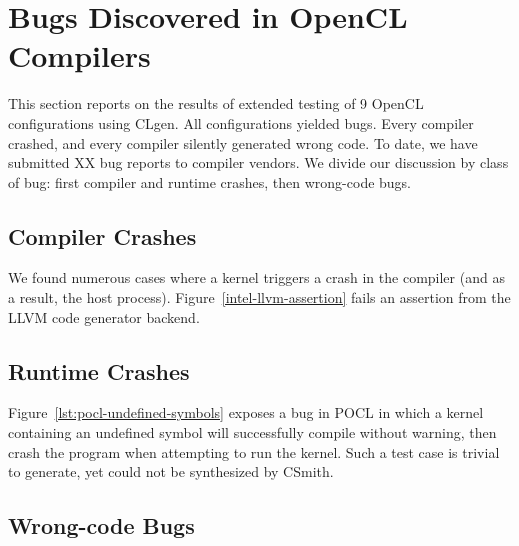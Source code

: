 \section{Bugs Discovered in OpenCL Compilers}

This section reports on the results of extended testing of 9 OpenCL configurations using CLgen. All configurations yielded bugs. Every compiler crashed, and every compiler silently generated wrong code. To date, we have submitted XX bug reports to compiler vendors. We divide our discussion by class of bug: first compiler and runtime crashes, then wrong-code bugs.

\subsection{Compiler Crashes}

We found numerous cases where a kernel triggers a crash in the compiler (and as a result, the host process). Figure~\ref{intel-llvm-assertion} fails an assertion from the LLVM code generator backend.


\subsection{Runtime Crashes}

Figure~\ref{lst:pocl-undefined-symbols} exposes a bug in POCL in which a kernel containing an undefined symbol will successfully compile without warning, then crash the program when attempting to run the kernel. Such a test case is trivial to generate, yet could not be synthesized by CSmith.

\subsection{Wrong-code Bugs}


